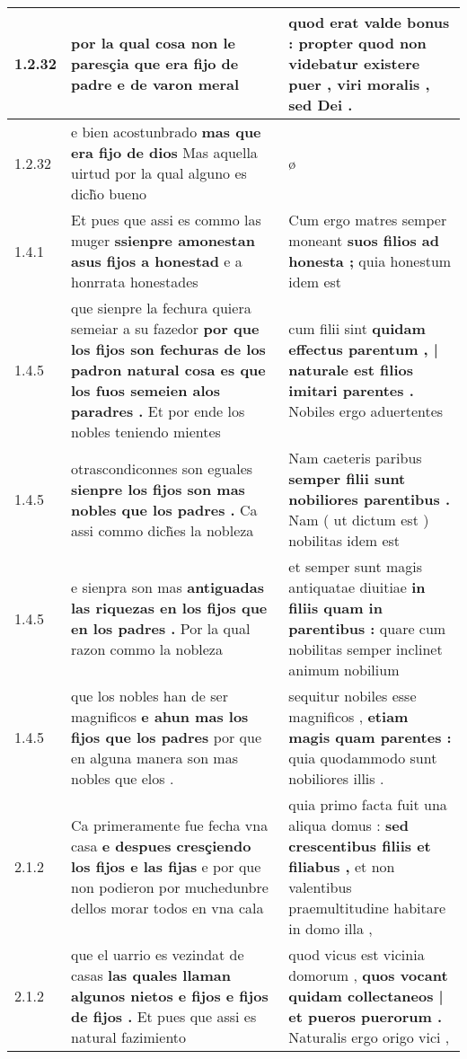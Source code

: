 \begin{tabular}{|p{1cm}|p{6.5cm}|p{6.5cm}|}
1.2.32 & por la qual cosa non le paresçia \textbf{ que era fijo de padre } e de varon meral & quod erat valde bonus : \textbf{ propter quod non videbatur existere puer , } viri moralis , sed Dei . \\\hline
1.2.32 & e bien acostunbrado \textbf{ mas que era fijo de dios } Mas aquella uirtud por la qual alguno es dich̃o bueno & ø \\\hline
1.4.1 & Et pues que assi es commo las muger \textbf{ ssienpre amonestan asus fijos a honestad } e a honrrata honestades & Cum ergo matres semper moneant \textbf{ suos filios ad honesta ; } quia honestum idem est \\\hline
1.4.5 & que sienpre la fechura quiera semeiar a su fazedor \textbf{ por que los fijos son fechuras de los padron natural cosa es que los fuos semeien alos paradres . } Et por ende los nobles teniendo mientes & cum filii sint \textbf{ quidam effectus parentum , | naturale est filios imitari parentes . } Nobiles ergo aduertentes \\\hline
1.4.5 & otrascondiconnes son eguales \textbf{ sienpre los fijos son mas nobles que los padres . } Ca assi commo dich̃es la nobleza & Nam caeteris paribus \textbf{ semper filii sunt nobiliores parentibus . } Nam ( ut dictum est ) nobilitas idem est \\\hline
1.4.5 & e sienpra son mas \textbf{ antiguadas las riquezas en los fijos que en los padres . } Por la qual razon commo la nobleza & et semper sunt magis antiquatae diuitiae \textbf{ in filiis quam in parentibus : } quare cum nobilitas semper inclinet animum nobilium \\\hline
1.4.5 & que los nobles han de ser magnificos \textbf{ e ahun mas los fijos que los padres } por que en alguna manera son mas nobles que elos . & sequitur nobiles esse magnificos , \textbf{ etiam magis quam parentes : } quia quodammodo sunt nobiliores illis . \\\hline
2.1.2 & Ca primeramente fue fecha vna casa \textbf{ e despues cresçiendo los fijos e las fijas } e por que non podieron por muchedunbre dellos morar todos en vna cala & quia primo facta fuit una aliqua domus : \textbf{ sed crescentibus filiis et filiabus , } et non valentibus praemultitudine habitare in domo illa , \\\hline
2.1.2 & que el uarrio es vezindat de casas \textbf{ las quales llaman algunos nietos e fijos e fijos de fijos . } Et pues que assi es natural fazimiento & quod vicus est vicinia domorum , \textbf{ quos vocant quidam collectaneos | et pueros puerorum . } Naturalis ergo origo vici , \\\hline

\end{tabular}
